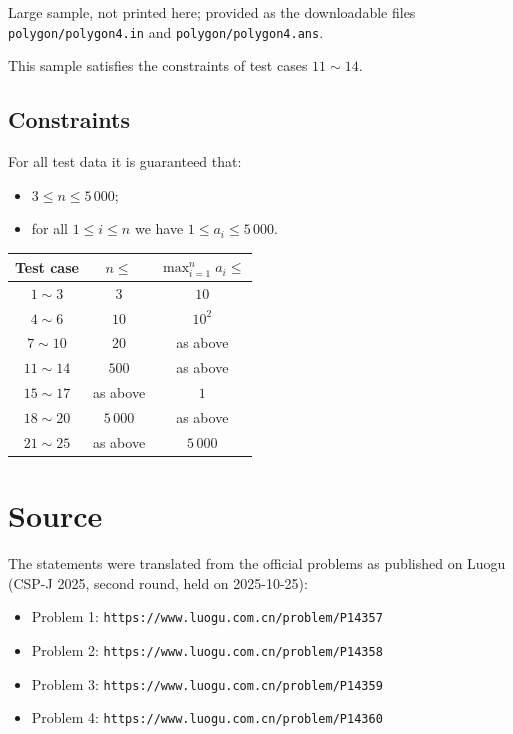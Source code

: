 \documentclass[11pt]{article}
\begin{document}
Large sample, not printed here;
provided as the downloadable files \texttt{polygon/polygon4.in} and \texttt{polygon/polygon4.ans}.

This sample satisfies the constraints of test cases $11 \sim 14$.

\subsection*{Constraints}

For all test data it is guaranteed that:
\begin{itemize}
\item $3 \leq n \leq 5\,000$;
\item for all $1 \leq i \leq n$ we have $1 \leq a_i \leq 5\,000$.
\end{itemize}

\begin{center}
\begin{tabular}{ccc}
\toprule
Test case & $n \leq$ & $\max_{i=1}^{n} a_i \leq$ \\
\midrule
$1 \sim 3$ & $3$ & $10$ \\
$4 \sim 6$ & $10$ & $10^2$ \\
$7 \sim 10$ & $20$ & as above \\
$11 \sim 14$ & $500$ & as above \\
$15 \sim 17$ & as above & $1$ \\
$18 \sim 20$ & $5\,000$ & as above \\
$21 \sim 25$ & as above & $5\,000$ \\
\bottomrule
\end{tabular}
\end{center}

\section*{Source}

The statements were translated from the official problems as published
on Luogu (CSP-J 2025, second round, held on 2025-10-25):
\begin{itemize}
\item Problem 1: \texttt{https://www.luogu.com.cn/problem/P14357}
\item Problem 2: \texttt{https://www.luogu.com.cn/problem/P14358}
\item Problem 3: \texttt{https://www.luogu.com.cn/problem/P14359}
\item Problem 4: \texttt{https://www.luogu.com.cn/problem/P14360}
\end{itemize}
\end{document}
